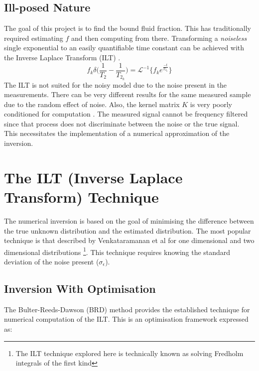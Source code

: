 \subsection{Ill-posed Nature}
The goal of this project is to find the bound fluid fraction. This has traditionally required estimating $f$ and then computing from there. Transforming a \textit{noiseless} single exponential to an easily quantifiable time constant can be achieved with the Inverse Laplace Transform (ILT) \cite{BulterReedsDawsonMethod1981}.
\begin{equation}
   f_k\delta   \bigg(   \frac{1}{T_{2}} - \frac{1}{T_{2_k}} \bigg) = \mathcal{L}^{-1} \bigg\{ f_k e^{\frac{-t}{T_{2_k}}} \bigg\}
    \label{eq:InverseLaplaceNaive}
\end{equation}
The ILT is not suited for the noisy model due to the noise present in the measurements. There can be very different results for the same measured sample due to the random effect of noise. Also, the kernel matrix $K$ is very poorly conditioned for computation \cite{NumericalFredholm1971hanson1971numerical}. The measured signal cannot be frequency filtered since that process does not discriminate between the noise or the true signal. This necessitates the implementation of a numerical approximation of the inversion.

\section{The ILT (Inverse Laplace Transform) Technique}
The numerical inversion is based on the goal of minimising the difference between the true unknown distribution and the estimated distribution. The most popular technique is that described by Venkataramanan et al for one dimensional and two dimensional distributions \cite{Venk2DFredholm2002} \footnote{The ILT technique explored here is technically known as solving Fredholm integrals of the first kind}. This technique requires knowing the standard deviation of the noise present ($\sigma_\epsilon$).


\subsection{Inversion With Optimisation}
The Bulter-Reeds-Dawson (BRD) method \cite{BulterReedsDawsonMethod1981} provides the established technique for numerical computation of the ILT. This is an optimisation framework expressed as:
    
